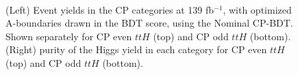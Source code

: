 \begin{figure}[htbp]
 \centering
	 \\
  \caption{(Left) Event yields in the CP categories at 139 fb$^{-1}$, with optimized A-boundaries drawn in the BDT score, using the Nominal CP-BDT. Shown separately for CP even $ttH$ (top) and CP odd $ttH$ (bottom). (Right) purity of the Higgs yield in each category for CP even $ttH$ (top) and CP odd $ttH$ (bottom).}
  \label{fig:nominalBs}
\end{figure}

